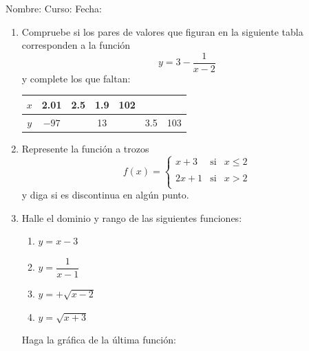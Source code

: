 \documentclass[letterpaper,fleqn]{article}
\newcommand{\LineaNombre}{%
\par
\vspace{\baselineskip}
Nombre:\hrulefill \; Curso: \underline{\hspace*{48pt}} \; Fecha: \underline{\hspace*{2.5cm}} \relax
\par}
\begin{document}
\LineaNombre
\begin{enumerate}
 \item Compruebe si los pares de valores que figuran en la siguiente tabla corresponden a la función
 \[y=3-\dfrac{1}{x-2}\]
 y complete los que faltan:\\
 
 \begin{tabular}{|c|c|c|c|c|c|c|}
 \hline 
 $x$ & 2.01 & 2.5 & 1.9 & 102 &  &  \\ 
 \hline 
$y$ & $-97$ &  & 13 &  & 3.5 & 103 \\ 
 \hline 
 \end{tabular}
 \item Represente la función a trozos
\[f(x)=\left\{ \begin{array}{lcl}
x+3 & \mbox{si} & x\leq 2\\
&
& \\
2x+1 & \mbox{si} & x> 2\\
\end{array}
\right.\]
y diga si es discontinua en algún punto.
\item Halle el dominio y rango de las siguientes funciones:
\begin{enumerate}
\item $y=x-3$
\item $y=\dfrac{1}{x-1}$
\item $y=+\sqrt{x-2}$
\item $y=\sqrt{x+3}$
\end{enumerate}
Haga la gráfica de la última función:
 \end{enumerate}
\end{document}
